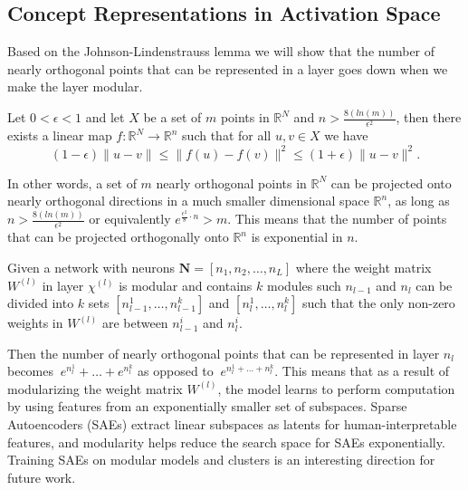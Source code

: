 \subsection{Concept Representations in Activation Space}\label{sec:theoretical-representations}

Based on the Johnson-Lindenstrauss lemma we will show that the number of nearly orthogonal points that can be represented in a layer goes down when we make the layer modular.

\begin{proposition}
Let $0< \epsilon < 1$ and let $X$ be a set of $m$ points in $\mathbb{R}^N$ and $n > \frac{8(ln(m))}{\epsilon^2}$,
then there exists a linear map $f \colon \mathbb{R}^N \rightarrow \mathbb{R}^n$ such that for all $u,v \in X$ we have
\[ (1- \epsilon) \| u - v\|  \leq \| f(u) - f(v) \|^2 \leq (1+ \epsilon) \| u - v \|^2. \]
\end{proposition}

In other words, a set of $m$ nearly orthogonal points in $\mathbb{R}^N$ can be projected onto nearly orthogonal directions in a much smaller dimensional space $\mathbb{R}^n$,
as long as $n > \frac{8(ln(m))}{\epsilon^2}$ or equivalently $ e^{\frac{ \epsilon^2 }{8} \cdot n} > m $.
This means that the number of points that can be projected orthogonally onto $\mathbb{R}^n$ is exponential in $n$.

Given a network with neurons $\mathbf{N} = [n_1, n_2, \ldots, n_L]$ where the weight matrix $W^{(l)}$ in layer $\chi^{(l)}$ is modular and contains $k$ modules such $n_{l-1}$ and $n_{l}$ can be divided into $k$ sets $[n_{l-1}^1, \ldots, n_{l-1}^k]$ and $[n_{l}^1, \ldots, n_{l}^k]$ such that the only non-zero weights in $W^{(l)}$ are between $n_{l-1}^i$ and $n_{l}^i$.

Then the number of nearly orthogonal points that can be represented in layer $n_l$ becomes $~ e^{n_{l}^1} + \ldots + e^{n_{l}^k} $ as opposed to $~ e^{   {n_{l}^1} + \ldots + {n_{l}^k} }$. 
This means that as a result of modularizing the weight matrix $W^{(l)}$, the model learns to perform computation by using features from an exponentially smaller set of subspaces. Sparse Autoencoders (SAEs) \cite{cunningham2023sparseautoencodershighlyinterpretable} extract linear subspaces as latents for human-interpretable features, and modularity helps reduce the search space for SAEs exponentially. Training SAEs on modular models and clusters is an interesting direction for future work.


